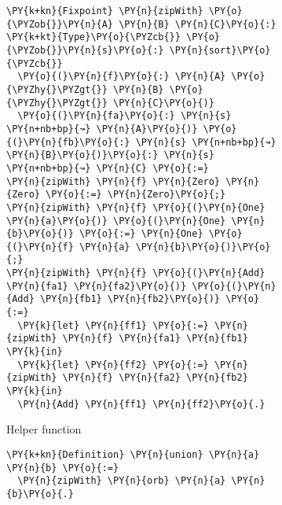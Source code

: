\begin{figure}
\begin{subfigure}{0.5\textwidth}
\begin{Verbatim}[commandchars=\\\{\}]
\PY{k+kn}{Fixpoint} \PY{n}{zipWith} \PY{o}{\PYZob{}}\PY{n}{A} \PY{n}{B} \PY{n}{C}\PY{o}{:} \PY{k+kt}{Type}\PY{o}{\PYZcb{}} \PY{o}{\PYZob{}}\PY{n}{s}\PY{o}{:} \PY{n}{sort}\PY{o}{\PYZcb{}}
  \PY{o}{(}\PY{n}{f}\PY{o}{:} \PY{n}{A} \PY{o}{\PYZhy{}\PYZgt{}} \PY{n}{B} \PY{o}{\PYZhy{}\PYZgt{}} \PY{n}{C}\PY{o}{)}
  \PY{o}{(}\PY{n}{fa}\PY{o}{:} \PY{n}{s} \PY{n+nb+bp}{↝} \PY{n}{A}\PY{o}{)} \PY{o}{(}\PY{n}{fb}\PY{o}{:} \PY{n}{s} \PY{n+nb+bp}{↝} \PY{n}{B}\PY{o}{)}\PY{o}{:} \PY{n}{s} \PY{n+nb+bp}{↝} \PY{n}{C} \PY{o}{:=}
\PY{n}{zipWith} \PY{n}{f} \PY{n}{Zero} \PY{n}{Zero} \PY{o}{:=} \PY{n}{Zero}\PY{o}{;}
\PY{n}{zipWith} \PY{n}{f} \PY{o}{(}\PY{n}{One} \PY{n}{a}\PY{o}{)} \PY{o}{(}\PY{n}{One} \PY{n}{b}\PY{o}{)} \PY{o}{:=} \PY{n}{One} \PY{o}{(}\PY{n}{f} \PY{n}{a} \PY{n}{b}\PY{o}{)}\PY{o}{;}
\PY{n}{zipWith} \PY{n}{f} \PY{o}{(}\PY{n}{Add} \PY{n}{fa1} \PY{n}{fa2}\PY{o}{)} \PY{o}{(}\PY{n}{Add} \PY{n}{fb1} \PY{n}{fb2}\PY{o}{)} \PY{o}{:=}
  \PY{k}{let} \PY{n}{ff1} \PY{o}{:=} \PY{n}{zipWith} \PY{n}{f} \PY{n}{fa1} \PY{n}{fb1} \PY{k}{in}
  \PY{k}{let} \PY{n}{ff2} \PY{o}{:=} \PY{n}{zipWith} \PY{n}{f} \PY{n}{fa2} \PY{n}{fb2} \PY{k}{in}
  \PY{n}{Add} \PY{n}{ff1} \PY{n}{ff2}\PY{o}{.}
\end{Verbatim}
  \caption{Helper function}
  \label{code:zipwith}
  \vspace{1cm}
\end{subfigure}
\hfill
\begin{subfigure}{0.3\textwidth}


\begin{Verbatim}[commandchars=\\\{\}]
\PY{k+kn}{Definition} \PY{n}{union} \PY{n}{a} \PY{n}{b} \PY{o}{:=}
  \PY{n}{zipWith} \PY{n}{orb} \PY{n}{a} \PY{n}{b}\PY{o}{.}


\end{Verbatim}
\end{subfigure}
\end{figure}
